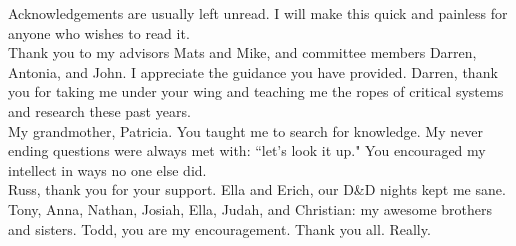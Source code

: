Acknowledgements are usually left unread. I will make this quick and painless for anyone who wishes to read it. \\

Thank you to my advisors Mats and Mike, and committee members Darren, Antonia, and John. I appreciate the guidance you have provided. Darren, thank you for taking me under your wing and teaching me the ropes of critical systems and research these past years.\\

My grandmother, Patricia. You taught me to search for knowledge.  My never ending questions were always met with: ``let's look it up." You encouraged my intellect in ways no one else did. \\

Russ, thank you for your support. Ella and Erich, our D\&D nights kept me sane. Tony, Anna, Nathan, Josiah, Ella, Judah, and Christian: my awesome brothers and sisters. Todd, you are my encouragement. Thank you all. Really. 



